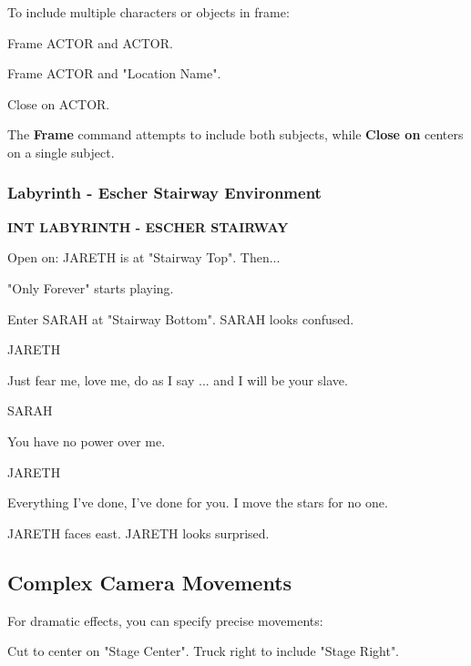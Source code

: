 \documentclass[11pt,letterpaper,oldstylefigures]{memoir}
\newcommand{\slugline}[1]{\nobreak\textbf{\MakeUppercase{#1}}\par\nobreak\vspace{1\baselineskip}}
\newcommand{\speaker}[1]{\nobreak\hspace*{0.333\textwidth}\MakeUppercase{#1}\par\nobreak\vspace{0.5\baselineskip}}
\newcommand{\dialogue}[1]{\nobreak\hspace*{0.25\textwidth}\begin{minipage}{0.5\textwidth}#1\end{minipage}\par\vspace{1\baselineskip}}
\newcommand{\stagedir}[1]{#1\par\vspace{1\baselineskip}}
\newenvironment{FountainExample}
  {\begingroup
  \ttfamily\small
   \setlength{\parindent}{0pt}
  \setlength{\parskip}{0.5em}
  \allowdisplaybreaks
  \setlength{\displaywidowpenalty}{0}
  \setlength{\widowpenalty}{0}
  \setlength{\clubpenalty}{0}
  \setlength{\interlinepenalty}{0}
}
  {\endgroup}
\newcommand{\fountain}[1]{\textbf{#1}}
\begin{document}
To include multiple characters or objects in frame:

\begin{FountainExample}
\stagedir{Frame ACTOR and ACTOR.}
\end{FountainExample}

\begin{FountainExample}
\stagedir{Frame ACTOR and "Location Name".}
\end{FountainExample}

\begin{FountainExample}
\stagedir{Close on ACTOR.}
\end{FountainExample}

The \fountain{Frame} command attempts to include both subjects, while \fountain{Close on} centers on a single subject.

\subsubsection*{Labyrinth - Escher Stairway Environment}
\label{ex:labyrinth-escher-stairway}

\begin{FountainExample}
\slugline{INT LABYRINTH - ESCHER STAIRWAY}

\stagedir{Open on: JARETH is at "Stairway Top". Then...}
\stagedir{"Only Forever" starts playing.}
\stagedir{Enter SARAH at "Stairway Bottom". SARAH looks confused.}

\speaker{JARETH}
\dialogue{Just fear me, love me, do as I say ... and I will be your slave.}

\speaker{SARAH}
\dialogue{You have no power over me.}

\speaker{JARETH}
\dialogue{Everything I've done, I've done for you. I move the stars for no one.}

\stagedir{JARETH faces east. JARETH looks surprised.}
\end{FountainExample}

\subsection{Complex Camera Movements}

For dramatic effects, you can specify precise movements:

\begin{FountainExample}
\stagedir{Cut to center on "Stage Center". Truck right to include "Stage Right".}
\end{FountainExample}
\end{document}
